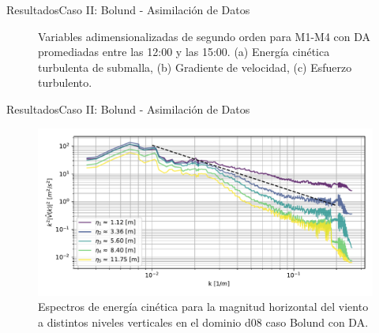 \documentclass[mathserif,10pt]{beamer}
\begin{document}
\begin{frame}{Resultados}{Caso II: Bolund - Asimilación de Datos}
\begin{figure}[H]
\begin{center}
		\end{center}
		\vspace{-5mm}
		\caption{Variables adimensionalizadas de segundo orden para M1-M4 con DA promediadas entre las 12:00 y las 15:00. (a) Energía cinética turbulenta de submalla, (b) Gradiente de velocidad, (c) Esfuerzo turbulento. }
		\label{fig:06_bol_da_mean_secondorder}
	\end{figure}
\end{frame}

\begin{frame}{Resultados}{Caso II: Bolund - Asimilación de Datos}
	\begin{figure}[H]
		\centering
		\hspace*{-5mm}\includegraphics[width=1.1\linewidth,page=1,trim={3mm 5mm -7mm 3mm},clip]{fig/06/bol_da/spectra}%
		\caption{Espectros de energía cinética para la magnitud horizontal del viento a distintos niveles verticales en el dominio d08 caso Bolund con DA.}
		\label{fig:06_bol_da_spectrum}
	\end{figure}
\end{frame}
\end{document}
